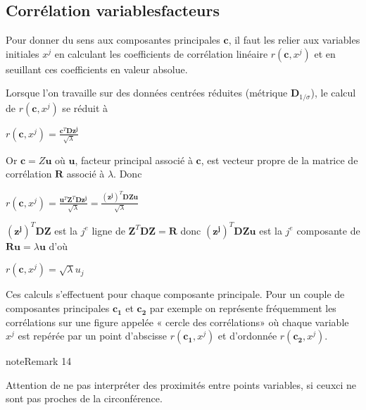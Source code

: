 \documentclass[letterpaper,10pt,french]{sphinxmanual}
\begin{document}
\subsection{Corrélation variables\sphinxhyphen{}facteurs}
\label{\detokenize{acp:correlation-variables-facteurs}}
\sphinxAtStartPar
Pour donner du sens aux composantes principales \(\mathbf{c}\), il faut les relier aux variables initiales \(x^j\) en calculant les coefficients de corrélation linéaire  \(r(\mathbf{c},x^j)\) et en seuillant ces coefficients en valeur absolue.

\sphinxAtStartPar
Lorsque l’on travaille sur des données centrées réduites (métrique \(\mathbf D_{1/\sigma}\)), le calcul de \(r(\mathbf{c},x^j)\) se réduit à

\sphinxAtStartPar
\(r(\mathbf{c},x^j)=\frac{\mathbf{c}^T\mathbf D\mathbf{z^j}}{\sqrt{\lambda}}\)

\sphinxAtStartPar
Or \(\mathbf{c}=Z\mathbf{u}\) où \(\mathbf{u}\), facteur principal associé à \(\mathbf{c}\), est vecteur propre de la matrice de corrélation \(\mathbf R\) associé à \(\lambda\). Donc

\sphinxAtStartPar
\(r(\mathbf{c},x^j)=\frac{\mathbf{u}^T\mathbf Z^T\mathbf D\mathbf{z^j}}{\sqrt{\lambda}}=\frac{(\mathbf{z^j})^T\mathbf D\mathbf Z\mathbf{u}}{\sqrt{\lambda}}\)

\sphinxAtStartPar
\((\mathbf{z^j})^T\mathbf D\mathbf Z\) est la \(j^e\) ligne de \(\mathbf Z^T\mathbf D\mathbf Z=\mathbf R\) donc \((\mathbf{z^j})^T\mathbf D \mathbf Z \mathbf{u}\) est la \(j^e\) composante de \(\mathbf R\mathbf{u}=\lambda \mathbf{u}\) d’où

\sphinxAtStartPar
\(r(\mathbf{c},x^j)=\sqrt{\lambda}u_j\)

\sphinxAtStartPar
Ces calculs s’effectuent pour chaque composante principale. Pour un couple de composantes principales \(\mathbf{c_1}\) et \(\mathbf{c_2}\) par exemple on représente fréquemment les corrélations sur une figure appelée « cercle des corrélations» où chaque variable \(x^j\) est repérée par un point d’abscisse \(r(\mathbf{c_1},x^j)\) et d’ordonnée \(r(\mathbf{c_2},x^j)\).

\sphinxAtStartPar
{}
\label{acp:remark-2}
\begin{sphinxadmonition}{note}{Remark 14}



\sphinxAtStartPar
Attention de ne pas interpréter des proximités entre points variables, si ceux\sphinxhyphen{}ci ne sont pas proches de la circonférence.
\end{sphinxadmonition}
\end{document}
